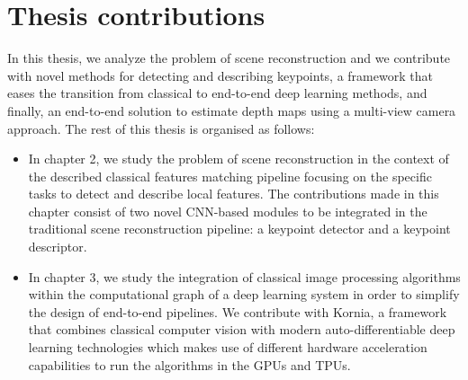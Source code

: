 \newpage
\section{Thesis contributions} 

In this thesis, we analyze the problem of scene reconstruction and we contribute with novel methods for detecting and describing keypoints, a framework that eases the transition from classical to end-to-end deep learning methods, and finally, an end-to-end solution to estimate depth maps using a multi-view camera approach. The rest of this thesis is organised as follows:

\begin{itemize}
    \item In chapter 2, we study the problem of scene reconstruction in the context of the described classical features matching pipeline focusing on the specific tasks to detect and describe local features. The contributions made in this chapter consist of two novel CNN-based modules to be integrated in the traditional scene reconstruction pipeline: a keypoint detector and a keypoint descriptor.
    
    \item In chapter 3, we study the integration of classical image processing algorithms within the computational graph of a deep learning system in order to simplify the design of end-to-end pipelines. We contribute with Kornia, a framework that combines classical computer vision with modern auto-differentiable deep learning technologies which makes use of different hardware acceleration capabilities to run the algorithms in the GPUs and TPUs. 
    

\end{itemize}
